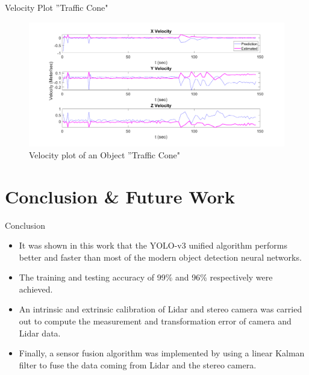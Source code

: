 \documentclass[10pt]{beamer}
\begin{document}
\begin{frame}{Velocity Plot ''Traffic Cone"}
\begin{figure}
    \centering
    \includegraphics[width=1\textwidth]{Images/TC_velocity.png}
    \caption{Velocity plot of an Object ''Traffic Cone"}
\end{figure}
\end{frame}



\section{Conclusion \& Future Work}


\begin{frame}{Conclusion}
  \begin{itemize}
      \item It was shown in this work that the YOLO-v3 unified algorithm performs better and faster than most of the modern object detection neural networks.
      \item The training and testing accuracy of 99\% and 96\% respectively were achieved. 
      \item An intrinsic and extrinsic calibration of Lidar and stereo camera was carried out to compute the measurement and transformation error of camera and Lidar data.
      \item Finally, a sensor fusion algorithm was implemented by using a linear Kalman filter to fuse the data coming from Lidar and the stereo camera.
  \end{itemize}  
\end{frame}
\end{document}
